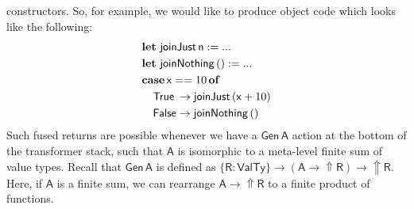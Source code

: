 \documentclass[acmsmall,screen,review,anonymous]{acmart}
\newcommand{\mit}[1]{{\mathsf{#1}}}
\newcommand{\msf}[1]{{\mathsf{#1}}}
\newcommand{\mbf}[1]{{\mathbf{#1}}}
\newcommand{\ind}{\hspace{1em}}
\newcommand{\of}{\mbf{of}\,}
\newcommand{\letdef}{\mbf{let\,}}
\newcommand{\vn}{\mathsf{n}}
\newcommand{\vA}{\mathsf{A}}
\newcommand{\vR}{\mathsf{R}}
\newcommand{\vx}{\mathsf{x}}
\newcommand{\case}{\mbf{case\,}}
\newcommand{\Up}{{\Uparrow}}
\newcommand{\VTy}{\msf{ValTy}}
\newcommand{\True}{\msf{True}}
\newcommand{\False}{\msf{False}}
\theoremstyle{remark}
\newcommand{\Gen}{\msf{Gen}}
\begin{document}
constructors. So, for example, we would like to produce object code which looks
like the following:
\begin{alignat*}{3}
  & \letdef\,\mit{joinJust}\,\vn := ...\\
  & \letdef\,\mit{joinNothing}\,() := ...\\
  & \case \vx == 10\,\of\\
  & \ind \True \hspace{0.2em}\to \mit{joinJust}\,(\vx + 10) \\
  & \ind \False \to \mit{joinNothing}\,()
\end{alignat*}
Such fused returns are possible whenever we have a $\Gen\,\vA$ action at the
bottom of the transformer stack, such that $\vA$ is isomorphic to a meta-level
finite sum of value types. Recall that $\Gen\,\vA$ is defined as $\{\vR : \VTy\} \to
(\vA \to \Up \vR) \to \Up \vR$. Here, if $\vA$ is a finite sum, we can rearrange $\vA \to
\Up \vR$ to a finite product of functions.
\end{document}

